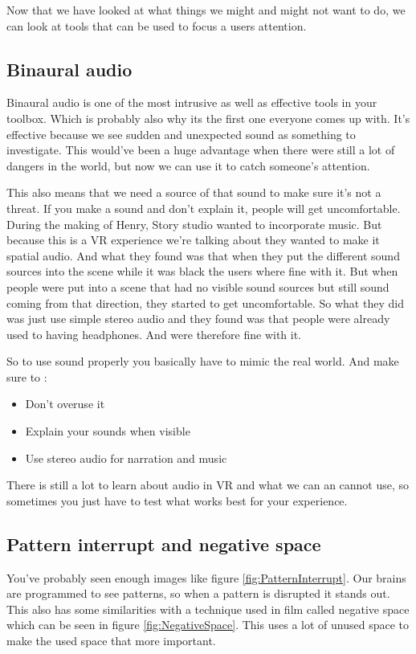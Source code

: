 \documentclass{report}
\begin{document}
				Now that we have looked at what things we might and might not want to do, we can look at tools that can be used to focus a users attention.
				
				
				\subsection{Binaural audio}
				Binaural audio is one of the most intrusive as well as effective tools in your toolbox. Which is probably also why its the first one everyone comes up with. It's effective because we see sudden and unexpected sound as something to investigate. This would've been a huge advantage when there were still a lot of dangers in the world, but now we can use it to catch someone's attention.
				
				This also means that we need a source of that sound to make sure it's not a threat. If you make a sound and don't explain it, people will get uncomfortable. During the making of Henry, Story studio wanted to incorporate music. But because this is a VR experience we're talking about they wanted to make it spatial audio. And what they found was that when they put the different sound sources into the scene while it was black the users where fine with it. But when people were put into a scene that had no visible sound sources but still sound coming from that direction, they started to get uncomfortable. So what they did was just use simple stereo audio and they found was that people were already used to having headphones. And were therefore fine with it.
				
				So to use sound properly you basically have to mimic the real world. 
				And make sure to :
				\begin{itemize}
					\item Don't overuse it
					\item Explain your sounds when visible
					\item Use stereo audio for narration and music
				\end{itemize}
				There is still a lot to learn about audio in VR and what we can an cannot use, so sometimes you just have to test what works best for your experience. 
				
				
				\subsection{Pattern interrupt and negative space}
				You've probably seen enough images like figure \ref{fig:PatternInterrupt}. Our brains are programmed to see patterns, so when a pattern is disrupted it stands out. This also has some similarities with a technique used in film called negative space which can be seen in figure \ref{fig:NegativeSpace}. This uses a lot of unused space to make the used space that more important. 
							
\end{document}
